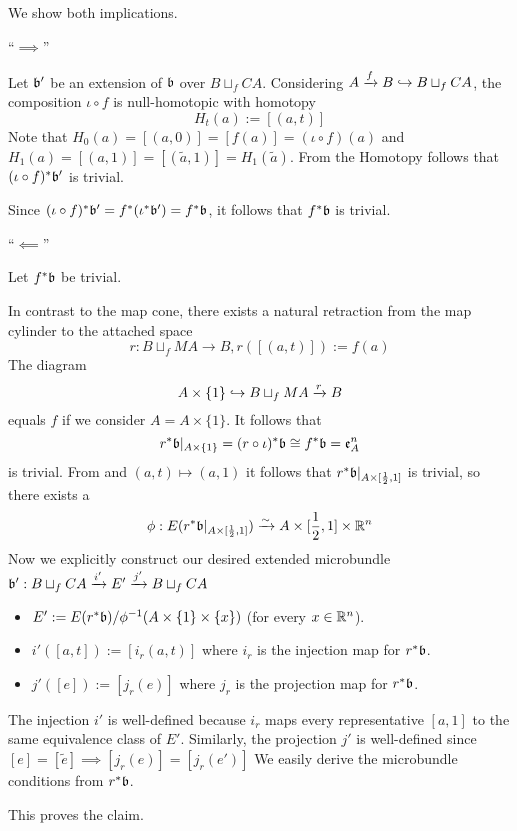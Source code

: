 \begin{myproof}
    We show both implications.

    ``$\implies$''

    Let $\bb'$ be an extension of $\bb$ over $B \sqcup_f CA$.
    Considering $A \xto{f} B \incl B \sqcup_f CA$, the composition $\iota \circ f$ is null-homotopic with homotopy
    \[ H_t(a) := [(a, t)] \]
    Note that $H_0(a) = [(a, 0)] = [f(a)] = (\iota \circ f)(a)$ and $H_1(a) = [(a, 1)] = [(\tilde{a}, 1)] = H_1(\tilde{a})$.
    From the Homotopy  follows that $(\iota \circ f)^*\bb'$ is trivial. 

    Since $(\iota \circ f)^*\bb' = f^*(\iota^*\bb') = f^*\bb$, it follows that $f^*\bb$ is trivial.

    ``$\impliedby$''

    Let $f^*\bb$ be trivial.

    In contrast to the map cone, there exists a natural retraction from the map cylinder to the attached space
    \[ r: B \sqcup_f MA \to B, r([(a, t)]) := f(a) \]
    The diagram
    \[ A \times \{1\} \incl B \sqcup_f MA \xto{r} B \]
    equals $f$ if we consider $A = A \times \{1\}$.
    It follows that
    \[ r^*\bb\restr{A \times \{1\}} = (r \circ \iota)^*\bb \cong f^*\bb = \mathfrak{e}^n_A\]
    is trivial.
    From  and $(a, t) \mapsto (a, 1)$ it follows that $r^*\bb\restr{A \times [\frac{1}{2}, 1]}$ is trivial,
    so there exists a
    \[ \phi: E(r^*\bb\restr{A \times [\frac{1}{2}, 1]}) \isomto A \times [\frac{1}{2}, 1] \times \R^n \]
    Now we explicitly construct our desired extended microbundle $\bundledef{\bb'}{B \sqcup_f CA}{E'}{i'}{j'}$
    \begin{itemize}
        \item $E' := E(r^*\bb) / \phi^{-1}(A \times \{1\} \times \{x\})$ (for every $x \in \R^n$).
        \item $i'([a, t]) := [i_r(a, t)]$ where $i_r$ is the injection map for $r^*\bb$.
        \item $j'([e]) := [j_r(e)]$ where $j_r$ is the projection map for $r^*\bb$.
    \end{itemize}
    The injection $i'$ is well-defined because $i_r$ maps every representative $[a, 1]$ to the same equivalence class of $E'$.
    Similarly, the projection $j'$ is well-defined since $[e] = [\tilde{e}] \implies [j_r(e)] = [j_r(e')]$
    We easily derive the microbundle conditions from $r^*\bb$.

    This proves the claim.
\end{myproof}